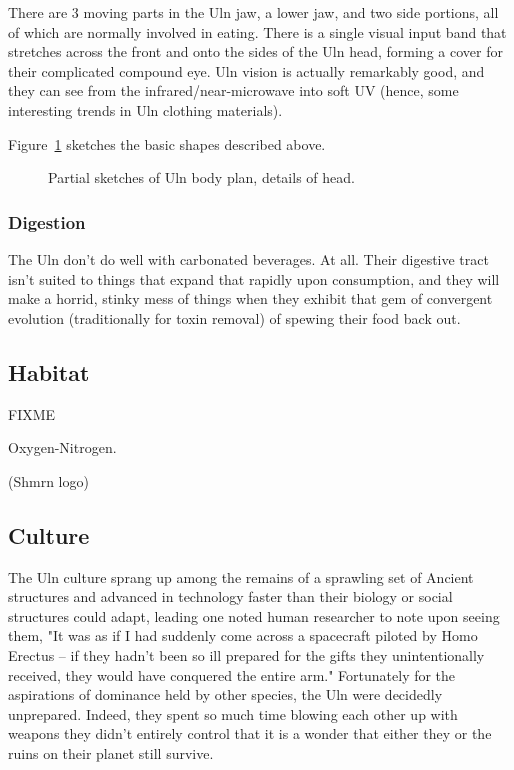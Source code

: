 There are 3 moving parts in the Uln jaw, a lower jaw, and two side
portions, all of which are normally involved in eating. There is a
single visual input band that stretches across the front and onto the
sides of the Uln head, forming a cover for their complicated compound
eye. Uln vision is actually remarkably good, and they can see from the
infrared/near-microwave into soft UV (hence, some interesting trends
in Uln clothing materials).

Figure~\ref{fig:Uln-bodyplan} sketches the basic shapes described above.

\begin{figure}
\begin{center}
    \caption{Partial sketches of Uln body plan, details of head.}
    \label{fig:Uln-bodyplan}
\end{center}
\end{figure}


\subsubsection{Digestion}

The Uln don't do well with carbonated beverages. At all. Their
digestive tract isn't suited to things that expand that rapidly upon
consumption, and they will make a horrid, stinky mess of things when
they exhibit that gem of convergent evolution (traditionally for toxin
removal) of spewing their food back out.

\subsection{Habitat}
FIXME 

Oxygen-Nitrogen.

       (Shmrn logo)


\subsection{Culture}
The Uln culture sprang up among the remains of a sprawling set of
Ancient structures and advanced in technology faster than their
biology or social structures could adapt, leading one noted human
researcher to note upon seeing them, "It was as if I had suddenly come
across a spacecraft piloted by Homo Erectus -- if they hadn't been so
ill prepared for the gifts they unintentionally received, they would
have conquered the entire arm." Fortunately for the aspirations of
dominance held by other species, the Uln were decidedly
unprepared. Indeed, they spent so much time blowing each other up with
weapons they didn't entirely control that it is a wonder that either
they or the ruins on their planet still survive.

